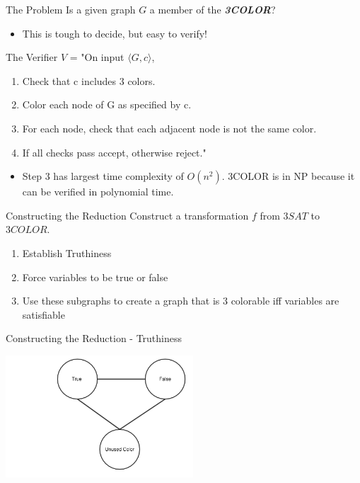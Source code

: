 \documentclass[bigger]{beamer}
\begin{document}
\begin{frame}[label=sec-4]{The Problem}
Is a given graph \(G\) a member of the \textbf{\textit{3COLOR}}?

\begin{itemize}
\item<2-> This is tough to decide, but easy to verify!
\end{itemize}
\end{frame}

\begin{frame}[label=sec-5]{The Verifier}
\(V\) = "On input \(\langle G, c \rangle\),
\begin{enumerate}
\item<1-> Check that c includes 3 colors.
\item<2-> Color each node of G as specified by c.
\item<3-> For each node, check that each adjacent node is not the same color.
\item<4-> If all checks pass accept, otherwise reject."
\end{enumerate}

\begin{itemize}
\item<5->Step 3 has largest time complexity of \(O(n^2)\). 3COLOR is in NP because it can be verified in polynomial time.
\end{itemize}
\end{frame}


\begin{frame}[label=sec-6]{Constructing the Reduction}
Construct a transformation \(f\) from \(3SAT\) to \(3COLOR\).
\begin{enumerate}
\item<2-> Establish Truthiness
\item<3-> Force variables to be true or false
\item<4-> Use these subgraphs to create a graph that is 3 colorable iff variables are satisfiable
\end{enumerate}
\end{frame}

\begin{frame}[label=sec-7]{Constructing the Reduction - Truthiness}
\begin{center}
\includegraphics[width=7cm]{Truthiness.png}
\end{center}
\end{frame}
\end{document}
